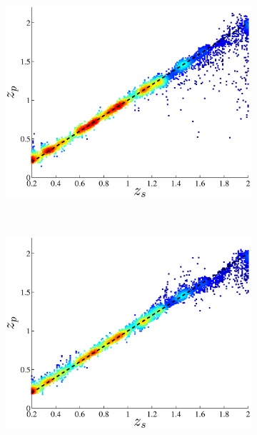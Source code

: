 \documentclass[useAMS,usenatbib,fleqn]{mn2e}
\begin{document}
\begin{figure}
        \centering
        \begin{subfigure}[b]{0.24\textwidth}
                \includegraphics[width=\textwidth]{figures/23_0.eps}
        \end{subfigure}
        ~
        \begin{subfigure}[b]{0.24\textwidth}
                \includegraphics[width=\textwidth]{figures/23_L.eps}
        \end{subfigure}
        ~
        \begin{subfigure}[b]{0.24\textwidth}

\end{subfigure}
\end{figure}
\end{document}
